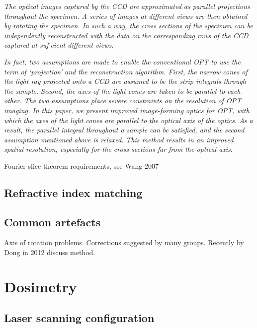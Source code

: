 \documentclass[12pt]{article}
\begin{document}
\textit{The optical images captured by the CCD are approximated as parallel projections throughout
 the specimen. A series of images at different views are then obtained by rotating the specimen.
 In such a way, the cross sections of the specimen can be independently reconstructed with the
 data on the corresponding rows of the CCD captured at sufcient different views.}\cite{Wang:2006hy}

\textit{ In fact, two assumptions are made to enable the conventional OPT to use the term of ‘projection’ and the reconstruction algorithm. First, the narrow cones of the light ray projected onto a CCD are assumed to be the strip integrals through the sample. Second, the axes of the light cones are taken to be parallel to each other. The two assumptions place severe constraints on the resolution of OPT imaging. In this paper, we present improved image-forming optics for OPT, with which the axes of the light cones are parallel to the optical axis of the optics. As a result, the parallel integral throughout a sample can be satisfied, and the second assumption mentioned above is relaxed. This method results in an improved spatial resolution, especially for the cross sections far from the optical axis}. \cite{Wang:2006hy}


Fourier slice theorem requirements, see Wang 2007 \cite{Wang:2007}

\subsection{Refractive index matching}

\subsection{Common artefacts}

Axis of rotation problems. Corrections suggested by many groups. Recently by Dong in 2012 \cite{Dong:2012}  discuss method.


\newpage
\section{Dosimetry}
\label{sec:dos}
\subsection{Laser scanning configuration}
\end{document}
